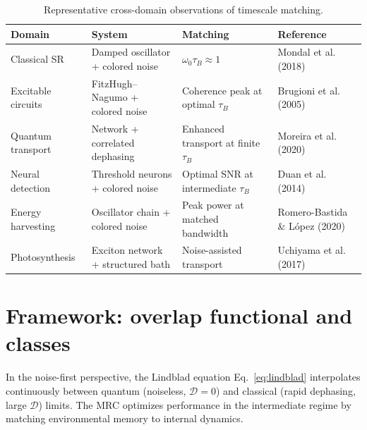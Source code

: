 \documentclass[11pt,letterpaper]{article}
\begin{document}
\begin{table}[t]
\centering
\caption{Representative cross-domain observations of timescale matching.}
\label{tab:synthesis}
\begin{tabularx}{\linewidth}{@{}lYYl@{}}
\toprule
Domain & System & Matching & Reference \\
\midrule
Classical SR & Damped oscillator + colored noise & $\omega_0 \tau_B \approx 1$ & Mondal et al. (2018) \cite{Mondal2018} \\
Excitable circuits & FitzHugh--Nagumo + colored noise & Coherence peak at optimal $\tau_B$ & Brugioni et al. (2005) \cite{Brugioni2005} \\
Quantum transport & Network + correlated dephasing & Enhanced transport at finite $\tau_B$ & Moreira et al. (2020) \cite{Moreira2020} \\
Neural detection & Threshold neurons + colored noise & Optimal SNR at intermediate $\tau_B$ & Duan et al. (2014) \cite{Duan2014} \\
Energy harvesting & Oscillator chain + colored noise & Peak power at matched bandwidth & Romero-Bastida \& L\'opez (2020) \cite{RomeroBastida2020} \\
Photosynthesis & Exciton network + structured bath & Noise-assisted transport & Uchiyama et al. (2017) \cite{Uchiyama2017} \\
\bottomrule
\end{tabularx}
\end{table}

\clearpage
\section{Framework: overlap functional and classes}
\label{sec:framework}

In the noise-first perspective, the Lindblad equation 
Eq.~\eqref{eq:lindblad} interpolates continuously between quantum 
(noiseless, $\mathcal{D}=0$) and classical (rapid dephasing, large 
$\mathcal{D}$) limits. The MRC optimizes performance in the intermediate 
regime by matching environmental memory to internal dynamics.
\end{document}
